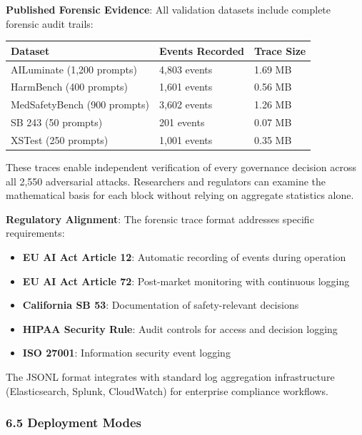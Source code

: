 \textbf{Published Forensic Evidence}: All validation datasets include
complete forensic audit trails:

{\def\LTcaptype{none} %
\begin{longtable}[]{@{}lll@{}}
\toprule\noalign{}
Dataset & Events Recorded & Trace Size \\
\midrule\noalign{}
\endhead
\bottomrule\noalign{}
\endlastfoot
AILuminate (1,200 prompts) & 4,803 events & 1.69 MB \\
HarmBench (400 prompts) & 1,601 events & 0.56 MB \\
MedSafetyBench (900 prompts) & 3,602 events & 1.26 MB \\
SB 243 (50 prompts) & 201 events & 0.07 MB \\
XSTest (250 prompts) & 1,001 events & 0.35 MB \\
\end{longtable}
}

These traces enable independent verification of every governance
decision across all 2,550 adversarial attacks. Researchers and
regulators can examine the mathematical basis for each block without
relying on aggregate statistics alone.

\textbf{Regulatory Alignment}: The forensic trace format addresses
specific requirements:

\begin{itemize}
\tightlist
\item
  \textbf{EU AI Act Article 12}: Automatic recording of events during
  operation
\item
  \textbf{EU AI Act Article 72}: Post-market monitoring with continuous
  logging
\item
  \textbf{California SB 53}: Documentation of safety-relevant decisions
\item
  \textbf{HIPAA Security Rule}: Audit controls for access and decision
  logging
\item
  \textbf{ISO 27001}: Information security event logging
\end{itemize}

The JSONL format integrates with standard log aggregation infrastructure
(Elasticsearch, Splunk, CloudWatch) for enterprise compliance workflows.

\subsubsection{6.5 Deployment Modes}\label{deployment-modes}

